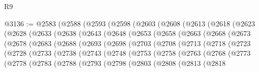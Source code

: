 \begin{lexlean}{R9}
\begin{coremodule}
{{{{{{{{{{{{{{{{{{{{{{{{{{{{{{{{{{{{{{{{{{{{{{{{{{{{{{{{{{{{{{{{{{{{{{{{{{{{{{{{{{{{{{{{{{{{{{{{{{{{{{{{{{{{@3136 := @2583
    (@2588
      (@2593
        (@2598
          (@2603
            (@2608
              (@2613
                (@2618
                  (@2623
                    (@2628
                      (@2633
                        (@2638
                          (@2643
                            (@2648
                              (@2653
                                (@2658
                                  (@2663
                                    (@2668
                                      (@2673
                                        (@2678
                                          (@2683
                                            (@2688
                                              (@2693
                                                (@2698
                                                  (@2703
                                                    (@2708
                                                      (@2713
                                                        (@2718
                                                          (@2723
                                                            (@2728
                                                              (@2733
                                                                (@2738
                                                                  (@2743
                                                                    (@2748
                                                                      (@2753
                                                                        (@2758
                                                                          (@2763
                                                                            (@2768
                                                                              (@2773
                                                                                (@2778
                                                                                  (@2783
                                                                                    (@2788
                                                                                      (@2793
                                                                                        (@2798
                                                                                          (@2803
                                                                                            (@2808
                                                                                              (@2813
                                                                                                (@2818
}}}}}}}}}}}}}}}}}}}}}}}}}}}}}}}}}}}}}}}}}}}}}}}}}}}}}}}}}}}}}}}}}}}}}}}}}}}}}}}}}}}}}}}}}}}}}}}}}}}}}}}}}}}}
\end{coremodule}
\end{lexlean}
